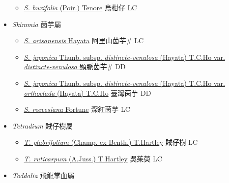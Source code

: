 \begin{itemize}
  \begin{itemize}
        \item[] \href{http://www.theplantlist.org/tpl1.1/search?q=Severinia+buxifolia}{\textit{S. buxifolia} (Poir.) Tenore}   烏柑仔 LC
  \end{itemize}
 \item[] \textit{Skimmia} 茵芋屬
                    
  \begin{itemize}
        \item[] \href{http://www.theplantlist.org/tpl1.1/search?q=Skimmia+arisanensis}{\textit{S. arisanensis} Hayata}   阿里山茵芋\# LC
        \item[] \href{http://www.theplantlist.org/tpl1.1/search?q=Skimmia+japonica+subsp.+distincte-venulosa+var.+distincte-venulosa}{\textit{S. japonica} Thunb. subsp. \textit{distincte-venulosa} (Hayata) T.C.Ho var. \textit{distincte-venulosa} }   顯脈茵芋\# DD
        \item[] \href{http://www.theplantlist.org/tpl1.1/search?q=Skimmia+japonica+subsp.+distincte-venulosa+var.+orthoclada}{\textit{S. japonica} Thunb. subsp. \textit{distincte-venulosa} (Hayata) T.C.Ho var. \textit{orthoclada} (Hayata) T.C.Ho}   臺灣茵芋 DD
        \item[] \href{http://www.theplantlist.org/tpl1.1/search?q=Skimmia+reevesiana}{\textit{S. reevesiana} Fortune}   深紅茵芋 LC
  \end{itemize}
 \item[] \textit{Tetradium} 賊仔樹屬
                    
  \begin{itemize}
        \item[] \href{http://www.theplantlist.org/tpl1.1/search?q=Tetradium+glabrifolium}{\textit{T. glabrifolium} (Champ. ex Benth.) T.Hartley}   賊仔樹 LC
        \item[] \href{http://www.theplantlist.org/tpl1.1/search?q=Tetradium+ruticarpum}{\textit{T. ruticarpum} (A.Juss.) T.Hartley}   吳茱萸 LC
  \end{itemize}
 \item[] \textit{Toddalia} 飛龍掌血屬
                    

\end{itemize}
